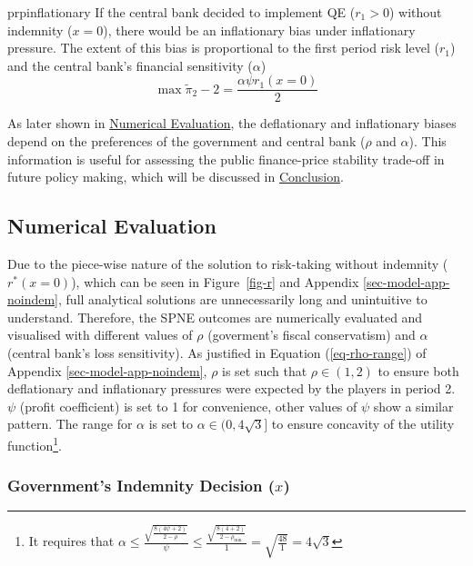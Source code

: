 \documentclass[
  a4paper,
  abstract=true]{scrartcl}
\theoremstyle{definition}
\begin{document}
\begin{restatable}{prp}{inflationary}
\label{prp-inflationary}
If the central bank decided to implement QE ($r_1>0$) without indemnity ($x=0$),
there would be an inflationary bias under inflationary pressure. The extent of this bias is proportional to the first period risk level ($r_1$) and the central bank's financial sensitivity ($\alpha$)
$$
\max\tilde\pi_2-2=\frac{\alpha\psi r_1(x=0)}{2}
$$
\end{restatable}

As later shown in \hyperref[sec-simulation]{Numerical Evaluation}, the
deflationary and inflationary biases depend on the preferences of the
government and central bank (\(\rho\) and \(\alpha\)). This information
is useful for assessing the public finance-price stability trade-off in
future policy making, which will be discussed in
\hyperref[sec-conclusion]{Conclusion}.

\subsection{Numerical Evaluation}\label{sec-simulation}

Due to the piece-wise nature of the solution to risk-taking without
indemnity (\(r^*(x=0)\)), which can be seen in Figure~\ref{fig-r} and
Appendix \ref{sec-model-app-noindem}, full analytical solutions are
unnecessarily long and unintuitive to understand. Therefore, the SPNE
outcomes are numerically evaluated and visualised with different values
of \(\rho\) (goverment's fiscal conservatism) and \(\alpha\) (central
bank's loss sensitivity). As justified in Equation (\ref{eq-rho-range})
of Appendix \ref{sec-model-app-noindem}, \(\rho\) is set such that
\(\rho\in(1,2)\) to ensure both deflationary and inflationary pressures
were expected by the players in period 2. \(\psi\) (profit coefficient)
is set to 1 for convenience, other values of \(\psi\) show a similar
pattern. The range for \(\alpha\) is set to \(\alpha\in(0,4\sqrt3]\) to
ensure concavity of the utility function\footnote{It requires that
  \(\alpha\leq\frac{\sqrt{\frac{8(4\psi+2)}{2-\rho}}}{\psi}\leq\frac{\sqrt{\frac{8(4+2)}{2-\rho_{\min} }}}{1}=\sqrt{\frac{48}{1}}=4\sqrt3\)}.

\subsubsection{\texorpdfstring{Government's Indemnity Decision
(\(x\))}{Government's Indemnity Decision (x)}}\label{sec-indemnity}
\end{document}
